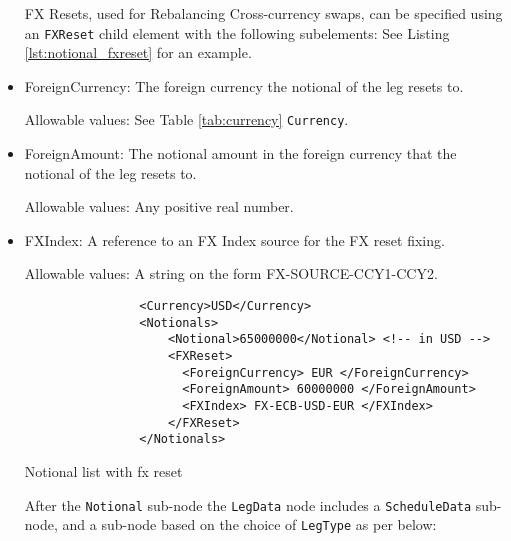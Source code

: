 \begin{itemize}
FX Resets,  used for Rebalancing Cross-currency swaps, can be specified using an \lstinline!FXReset! child element with the following subelements:  See Listing \ref{lst:notional_fxreset} for an example. \break

\item ForeignCurrency: The foreign currency the notional of the leg resets to.  

Allowable values:  See Table \ref{tab:currency} \lstinline!Currency!.

\item ForeignAmount: The notional amount in the foreign currency that the notional of the leg resets to.  

Allowable values:  Any positive real number.

\item FXIndex: A reference to an FX Index source for the FX reset fixing. 

Allowable values:  A string on the form FX-SOURCE-CCY1-CCY2.







 \begin{listing}[H]
\begin{verbatim}
                <Currency>USD</Currency>
                <Notionals>
                    <Notional>65000000</Notional> <!-- in USD -->
                    <FXReset>
                      <ForeignCurrency> EUR </ForeignCurrency>
                      <ForeignAmount> 60000000 </ForeignAmount>
                      <FXIndex> FX-ECB-USD-EUR </FXIndex>
                    </FXReset>
                </Notionals>
\end{verbatim}
\caption{Notional list with fx reset}
\label{lst:notional_fxreset}
\end{listing}


After the \lstinline!Notional! sub-node the \lstinline!LegData! node includes a \lstinline!ScheduleData! sub-node, and a sub-node based on the choice of \lstinline!LegType! as per below:


\end{itemize}
